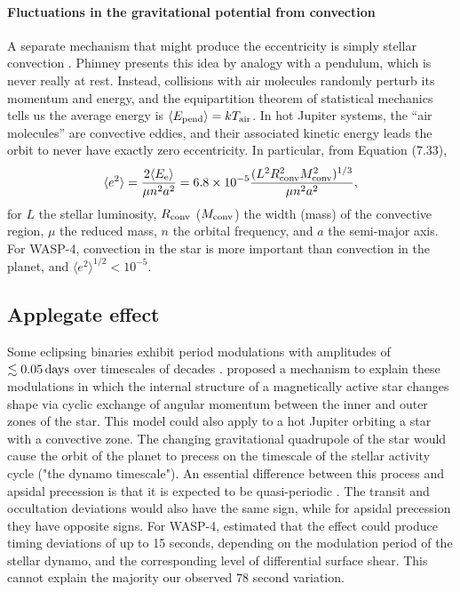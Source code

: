 \documentclass[12pt,twocolumn,tighten]{aastex62}
\begin{document}
\paragraph{Fluctuations in the gravitational potential from convection}
A separate mechanism that might produce the eccentricity is simply
stellar convection \citep[][Section 7]{phinney_pulsars_1992}.  Phinney
presents this idea by analogy with a pendulum, which is never really
at rest. Instead, collisions with air molecules randomly perturb its
momentum and energy, and the equipartition theorem of statistical
mechanics tells us the average energy is $\langle E_{\rm pend} \rangle
= k T_{\rm air}$.  In hot Jupiter systems, the ``air molecules'' are
convective eddies, and their associated kinetic energy leads the orbit
to never have exactly zero eccentricity.  In particular, from
\citealt{phinney_pulsars_1992} Equation (7.33),
\begin{equation}
  \langle e^2 \rangle =
  \frac{ 2 \langle E_{\rm e} \rangle }{\mu n^2 a^2}
  = 6.8\times10^{-5}
  \frac{(L^2 R_{\rm conv}^2 M_{\rm conv}^2)^{1/3}}{\mu n^2 a^2},
\end{equation}
for $L$ the stellar luminosity, $R_{\rm conv}$ ($M_{\rm conv}$) the
width (mass) of the convective region,  $\mu$ the reduced mass, $n$
the orbital frequency, and $a$ the semi-major axis.  For WASP-4,
convection in the star is more important than convection in the
planet, and $\langle e^2 \rangle^{1/2} < 10^{-5}$.


\subsection{Applegate effect}
Some eclipsing binaries exhibit period modulations with amplitudes of
$\lesssim 0.05\,{\rm days}$ over timescales of decades \citep[{\it
e.g.},][]{soderhjelm_geometry_1980,hall_relation_1989}.
\citet{applegate_mechanism_1992} proposed a mechanism to explain these
modulations in which the internal structure of a magnetically active
star changes shape via cyclic exchange of angular momentum between the
inner and outer zones of the star.  This model could also apply to a
hot Jupiter orbiting a star with a convective zone.  The changing
gravitational quadrupole of the star would cause the orbit of the
planet to precess on the timescale of the stellar activity cycle ("the
dynamo timescale").  An essential difference between this process and
apsidal precession is that it is expected to be quasi-periodic
\citep[{\it e.g.},][Figure~12]{soderhjelm_geometry_1980}.  The transit
and occultation deviations would also have the same sign, while for
apsidal precession they have opposite signs.  For WASP-4,
\citet{watson_orbital_2010} estimated that the effect could produce
timing deviations of up to 15 seconds, depending on the modulation
period of the stellar dynamo, and the corresponding level of
differential surface shear.  This cannot explain the majority our
observed $78$ second variation.
\end{document}
